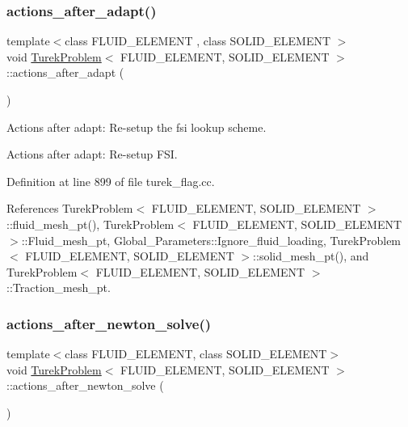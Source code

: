 \subsubsection{\texorpdfstring{actions\+\_\+after\+\_\+adapt()}{actions\_after\_adapt()}}
{\footnotesize\ttfamily template$<$class F\+L\+U\+I\+D\+\_\+\+E\+L\+E\+M\+E\+NT , class S\+O\+L\+I\+D\+\_\+\+E\+L\+E\+M\+E\+NT $>$ \\
void \hyperlink{classTurekProblem}{Turek\+Problem}$<$ F\+L\+U\+I\+D\+\_\+\+E\+L\+E\+M\+E\+NT, S\+O\+L\+I\+D\+\_\+\+E\+L\+E\+M\+E\+NT $>$\+::actions\+\_\+after\+\_\+adapt (\begin{DoxyParamCaption}{ }\end{DoxyParamCaption})}



Actions after adapt\+: Re-\/setup the fsi lookup scheme. 

Actions after adapt\+: Re-\/setup F\+SI. 

Definition at line 899 of file turek\+\_\+flag.\+cc.



References Turek\+Problem$<$ F\+L\+U\+I\+D\+\_\+\+E\+L\+E\+M\+E\+N\+T, S\+O\+L\+I\+D\+\_\+\+E\+L\+E\+M\+E\+N\+T $>$\+::fluid\+\_\+mesh\+\_\+pt(), Turek\+Problem$<$ F\+L\+U\+I\+D\+\_\+\+E\+L\+E\+M\+E\+N\+T, S\+O\+L\+I\+D\+\_\+\+E\+L\+E\+M\+E\+N\+T $>$\+::\+Fluid\+\_\+mesh\+\_\+pt, Global\+\_\+\+Parameters\+::\+Ignore\+\_\+fluid\+\_\+loading, Turek\+Problem$<$ F\+L\+U\+I\+D\+\_\+\+E\+L\+E\+M\+E\+N\+T, S\+O\+L\+I\+D\+\_\+\+E\+L\+E\+M\+E\+N\+T $>$\+::solid\+\_\+mesh\+\_\+pt(), and Turek\+Problem$<$ F\+L\+U\+I\+D\+\_\+\+E\+L\+E\+M\+E\+N\+T, S\+O\+L\+I\+D\+\_\+\+E\+L\+E\+M\+E\+N\+T $>$\+::\+Traction\+\_\+mesh\+\_\+pt.

\mbox{\label{classTurekProblem_ae97d3bad44e12274168e883c966b3983}} 
\subsubsection{\texorpdfstring{actions\+\_\+after\+\_\+newton\+\_\+solve()}{actions\_after\_newton\_solve()}}
{\footnotesize\ttfamily template$<$class F\+L\+U\+I\+D\+\_\+\+E\+L\+E\+M\+E\+NT, class S\+O\+L\+I\+D\+\_\+\+E\+L\+E\+M\+E\+NT$>$ \\
void \hyperlink{classTurekProblem}{Turek\+Problem}$<$ F\+L\+U\+I\+D\+\_\+\+E\+L\+E\+M\+E\+NT, S\+O\+L\+I\+D\+\_\+\+E\+L\+E\+M\+E\+NT $>$\+::actions\+\_\+after\+\_\+newton\+\_\+solve (\begin{DoxyParamCaption}{ }\end{DoxyParamCaption})\hspace{0.3cm}{\ttfamily [inline]}}



